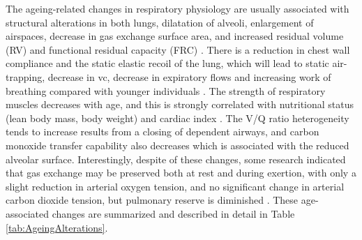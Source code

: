 The ageing-related changes in respiratory physiology are usually associated with structural alterations in both lungs, dilatation of alveoli, enlargement of airspaces, decrease in gas exchange surface area, and increased residual volume (RV) and functional residual capacity (FRC) \citep{sprung2006age,lalley2013aging}. There is a reduction in chest wall compliance and the static elastic recoil of the lung, which will lead to static air-trapping, decrease in \gls{vc}, decrease in expiratory flows and increasing work of breathing compared with younger individuals \citep{sprung2006age}. The strength of respiratory muscles decreases with age, and this is strongly correlated with nutritional status (lean body mass, body weight) and cardiac index \citep{janssens1999physiological}. The V/Q ratio heterogeneity tends to increase results from a closing of dependent airways, and carbon monoxide transfer capability also decreases which is associated with the reduced alveolar surface. Interestingly, despite of these changes, some research indicated that gas exchange may be preserved both at rest and during exertion, with only a slight reduction in arterial oxygen tension, and no significant change in arterial carbon dioxide tension, but pulmonary reserve is diminished \citep{janssens1999physiological, sprung2006age}. These age-associated changes are summarized and described in detail in Table \ref{tab:AgeingAlterations}.

